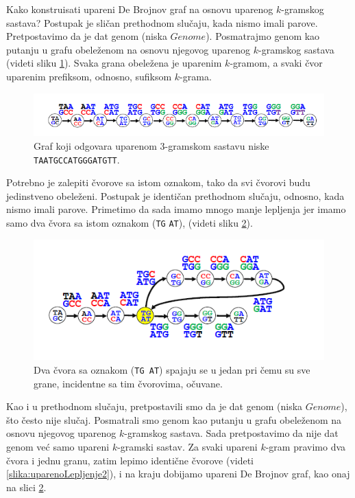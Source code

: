 Kako konstruisati upareni De Brojnov graf na osnovu uparenog $k$-gramskog sastava? Postupak je sličan prethodnom slučaju, kada nismo imali parove. Pretpostavimo da je dat genom (niska $Genome$). Posmatrajmo genom kao putanju u grafu obeleženom na osnovu njegovog uparenog $k$-gramskog sastava (videti sliku \ref{slika:upareniDeBrojnov}). Svaka grana obeležena je uparenim $k$-gramom, a svaki čvor uparenim prefiksom, odnosno, sufiksom $k$-grama.

\begin{figure}[h]
	\centering
	\includegraphics[width=1\textwidth]{poglavlja/3/slike/upareni_debrojnov.png}
	\caption{Graf koji odgovara uparenom 3-gramskom sastavu niske \texttt{TAATGCCATGGGATGTT}.}
	\label{slika:upareniDeBrojnov}
\end{figure} 

Potrebno je zalepiti čvorove sa istom oznakom, tako da svi čvorovi budu jedinstveno obeleženi. Postupak je identičan prethodnom slučaju, odnosno, kada nismo imali parove. Primetimo da sada imamo mnogo manje lepljenja jer imamo samo dva čvora sa istom oznakom (\texttt{TG} \texttt{AT}), (videti sliku \ref{slika:uparenoLepljenje}).

\begin{figure}[h]
	\centering
	\includegraphics[width=1\textwidth]{poglavlja/3/slike/upareno_lepljenje.png}
	\caption{Dva čvora sa oznakom (\texttt{TG AT}) spajaju se u jedan pri čemu su sve grane, incidentne sa tim čvorovima, očuvane.}
	\label{slika:uparenoLepljenje}
\end{figure} 

Kao i u prethodnom slučaju, pretpostavili smo da je dat genom (niska $Genome$), što često nije slučaj. Posmatrali smo genom kao putanju u grafu obeleženom na osnovu njegovog uparenog $k$-gramskog sastava. Sada pretpostavimo da nije dat genom već samo upareni $k$-gramski sastav. Za svaki upareni $k$-gram pravimo dva čvora i jednu granu, zatim lepimo identične čvorove (videti \ref{slika:uparenoLepljenje2}), i na kraju dobijamo upareni De Brojnov graf, kao onaj na slici \ref{slika:uparenoLepljenje}.

